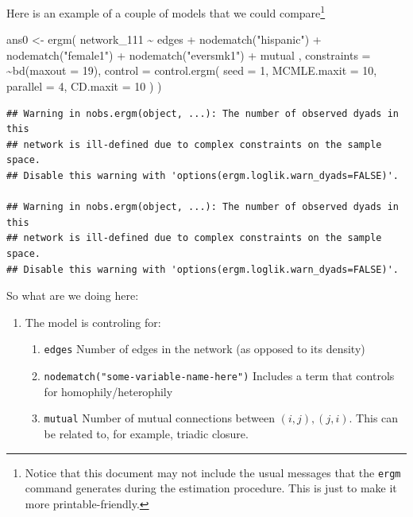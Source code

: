 \documentclass[
]{book}
\newenvironment{Shaded}{\begin{snugshade}}{\end{snugshade}}
\newcommand{\AttributeTok}[1]{\textcolor[rgb]{0.77,0.63,0.00}{#1}}
\newcommand{\DecValTok}[1]{\textcolor[rgb]{0.00,0.00,0.81}{#1}}
\newcommand{\FunctionTok}[1]{\textcolor[rgb]{0.00,0.00,0.00}{#1}}
\newcommand{\NormalTok}[1]{#1}
\newcommand{\OtherTok}[1]{\textcolor[rgb]{0.56,0.35,0.01}{#1}}
\newcommand{\SpecialCharTok}[1]{\textcolor[rgb]{0.00,0.00,0.00}{#1}}
\newcommand{\StringTok}[1]{\textcolor[rgb]{0.31,0.60,0.02}{#1}}
\begin{document}
Here is an example of a couple of models that we could compare\footnote{Notice that this document may not include the usual messages that the \texttt{ergm} command generates during the estimation procedure. This is just to make it more printable-friendly.}

\begin{Shaded}
\begin{Highlighting}[]
\NormalTok{ans0 }\OtherTok{\textless{}{-}} \FunctionTok{ergm}\NormalTok{(}
\NormalTok{  network\_111 }\SpecialCharTok{\textasciitilde{}}
\NormalTok{    edges }\SpecialCharTok{+}
    \FunctionTok{nodematch}\NormalTok{(}\StringTok{"hispanic"}\NormalTok{) }\SpecialCharTok{+}
    \FunctionTok{nodematch}\NormalTok{(}\StringTok{"female1"}\NormalTok{) }\SpecialCharTok{+}
    \FunctionTok{nodematch}\NormalTok{(}\StringTok{"eversmk1"}\NormalTok{) }\SpecialCharTok{+}
\NormalTok{    mutual}
\NormalTok{    ,}
  \AttributeTok{constraints =} \SpecialCharTok{\textasciitilde{}}\FunctionTok{bd}\NormalTok{(}\AttributeTok{maxout =} \DecValTok{19}\NormalTok{),}
  \AttributeTok{control =} \FunctionTok{control.ergm}\NormalTok{(}
    \AttributeTok{seed        =} \DecValTok{1}\NormalTok{,}
    \AttributeTok{MCMLE.maxit =} \DecValTok{10}\NormalTok{,}
    \AttributeTok{parallel    =} \DecValTok{4}\NormalTok{,}
    \AttributeTok{CD.maxit    =} \DecValTok{10}
\NormalTok{    )}
\NormalTok{  )}
\end{Highlighting}
\end{Shaded}

\begin{verbatim}
## Warning in nobs.ergm(object, ...): The number of observed dyads in this
## network is ill-defined due to complex constraints on the sample space.
## Disable this warning with 'options(ergm.loglik.warn_dyads=FALSE)'.

## Warning in nobs.ergm(object, ...): The number of observed dyads in this
## network is ill-defined due to complex constraints on the sample space.
## Disable this warning with 'options(ergm.loglik.warn_dyads=FALSE)'.
\end{verbatim}

So what are we doing here:

\begin{enumerate}
\def\labelenumi{\arabic{enumi}.}
\item
  The model is controling for:

  \begin{enumerate}
  \def\labelenumii{\alph{enumii}.}
  \item
    \texttt{edges} Number of edges in the network (as opposed to its density)
  \item
    \texttt{nodematch("some-variable-name-here")} Includes a term that controls for homophily/heterophily
  \item
    \texttt{mutual} Number of mutual connections between \((i, j), (j, i)\). This can be related to, for example, triadic closure.
  \end{enumerate}
\end{enumerate}
\end{document}
